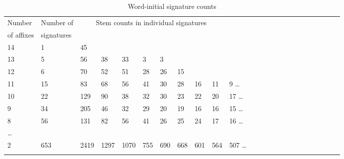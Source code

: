 \documentclass[output=paper,colorlinks,citecolor=brown]{langscibook}
\begin{document}
\begin{table}  
\begin{tabular}{llllllllllllllllllllllll} \lsptoprule
Number  &  Number of  & \multicolumn{8}{c}{Stem counts in  individual signatures } \\
 of affixes &   signatures & \multicolumn{8}{c}{} \\ \midrule
14 & 1 & 45  \\
13 & 5 & 56 & 38 & 33 & 3 & 3 \\
12 & 6 & 70 & 52 & 51 & 28 & 26 & 15   \\
11 & 15 & 83 & 68 & 56 & 41 & 30 & 28 & 16 & 11& 9 \ldots  \\
10 & 22 & 129 & 90 &  38 &  32 &  30 &  23 &  22 &  20 & 17    \ldots\\
9 &  34 & 205 &   46 &  32 &  29  &  20   &  19 &  16 &  16 & 15   \ldots\\
8 &   56 & 131 & 82 &  56 &  41 &  26 &  25 &  24 &  17 &  16       \ldots \\
\ldots \\
2 & 653 & 2419 &1297 & 1070 &  755 &  690 &  668 &  601 &  564 &  507    \ldots \\ \lspbottomrule
\end{tabular}
\caption{Word-initial signature counts}
\label{table2}
\end{table}
\end{document}
